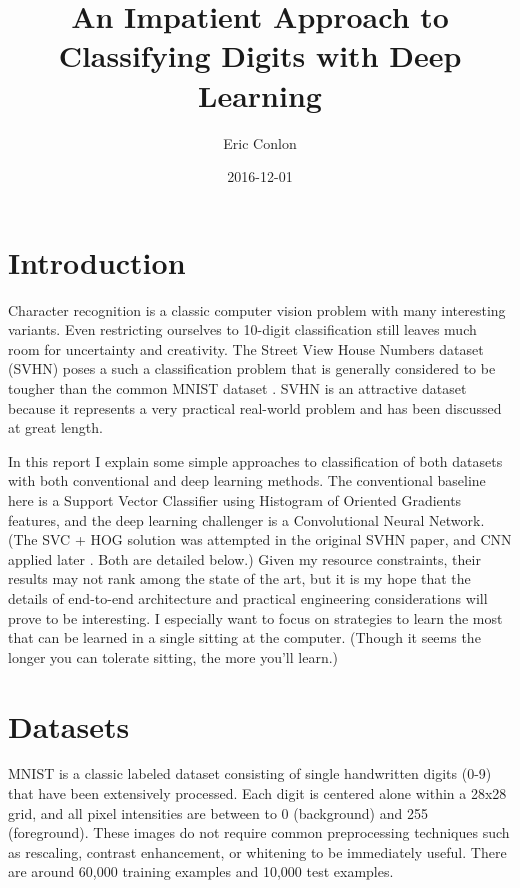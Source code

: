 \documentclass{article}
\begin{document}
\author{Eric Conlon}
\title{An Impatient Approach to Classifying Digits with Deep Learning}
\date{2016-12-01}

\maketitle{} %

\tableofcontents{} %

\section{Introduction}

Character recognition is a classic computer vision problem with many interesting variants. Even restricting ourselves to 10-digit classification still leaves much room for uncertainty and creativity. The Street View House Numbers dataset (SVHN) \cite{netzer2011reading} poses a such a classification problem that is generally considered to be tougher than the common MNIST dataset \cite{lecun1998mnist}. SVHN is an attractive dataset because it represents a very practical real-world problem and has been discussed at great length.

In this report I explain some simple approaches to classification of both datasets with both conventional and deep learning methods. The conventional baseline here is a Support Vector Classifier using Histogram of Oriented Gradients features, and the deep learning challenger is a Convolutional Neural Network. (The SVC + HOG solution was attempted in the original SVHN paper, and CNN applied later \cite{sermanet2012convolutional}. Both are detailed below.) Given my resource constraints, their results may not rank among the state of the art, but it is my hope that the details of end-to-end architecture and practical engineering considerations will prove to be interesting. I especially want to focus on strategies to learn the most that can be learned in a single sitting at the computer. (Though it seems the longer you can tolerate sitting, the more you'll learn.)

\section{Datasets}

MNIST is a classic labeled dataset consisting of single handwritten digits (0-9) that have been extensively processed. Each digit is centered alone within a 28x28 grid, and all pixel intensities are between to 0 (background) and 255 (foreground). These images do not require common preprocessing techniques such as rescaling, contrast enhancement, or whitening to be immediately useful. There are around 60,000 training examples and 10,000 test examples.
\end{document}
